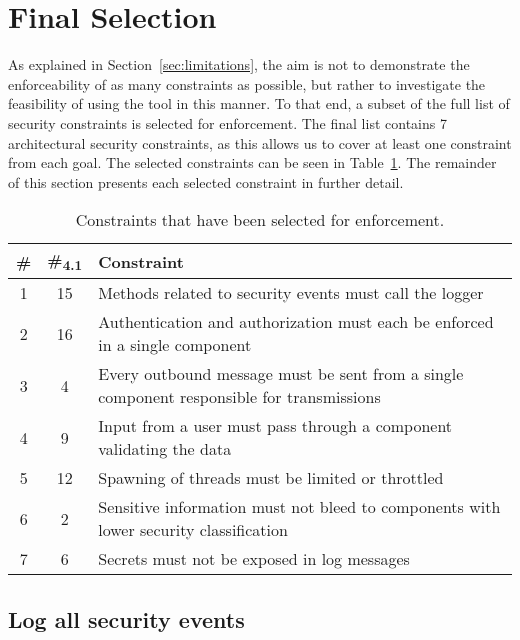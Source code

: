 \section{Final Selection}

As explained in Section~\ref{sec:limitations}, the aim is not to demonstrate the enforceability of as many constraints as possible, but rather to investigate the feasibility of using the tool in this manner. To that end, a subset of the full list of security constraints is selected for enforcement. The final list contains 7 architectural security constraints, as this allows us to cover at least one constraint from each goal. The selected constraints can be seen in Table~\ref{tab:selected_measures}. The remainder of this section presents each selected constraint in further detail.

\begin{table}
\begin{center}
\begin{tabular}{ccp{12.4cm}}
\hline
\textbf{\#} & \textbf{\#\textsubscript{4.1}} & \textbf{Constraint} \\
\hline
1 & 15 & Methods related to security events must call the logger\\
\rowcolor{RowColor}
2 & 16 & Authentication and authorization must each be enforced in a single component\\
3 & 4 & Every outbound message must be sent from a single component responsible for transmissions\\
\rowcolor{RowColor}
4 & 9 & Input from a user must pass through a component validating the data\\
5 & 12 & Spawning of threads must be limited or throttled\\
\rowcolor{RowColor}
6 & 2 & Sensitive information must not bleed to components with lower security classification\\
7 & 6 & Secrets must not be exposed in log messages\\
\hline
\end{tabular}
\end{center}
\caption{Constraints that have been selected for enforcement.}
\label{tab:selected_measures}
\end{table}


\subsection{Log all security events } 

